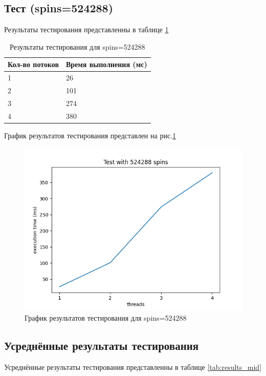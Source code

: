 \subsection*{Тест (spins=524288)}

Результаты тестирования представленны в таблице \ref{tab:results524288}


\begin{table}[H]
    \centering
    \begin{tabular}{|l|l|}
        \hline
        Кол-во потоков & Время выполнения (мс) \\
        \hline
        1 & 26 \\
        \hline
        2 & 101 \\
        \hline
        3 & 274 \\
        \hline
        4 & 380 \\
        \hline
    \end{tabular}
    \caption{Результаты тестирования для spins=524288}
    \label{tab:results524288}
\end{table}
        

График результатов тестирования представлен на рис.\ref{fig:plot524288}

\begin{figure}[H]
    \centering
    \includegraphics[width=0.7\linewidth]{photo/plot524288}
    \caption{График результатов тестирования для spins=524288}
    \label{fig:plot524288}
\end{figure}

\subsection*{Усреднённые результаты тестирования}

Усреднённые результаты тестирования представленны в таблице \ref{tab:results_mid}


